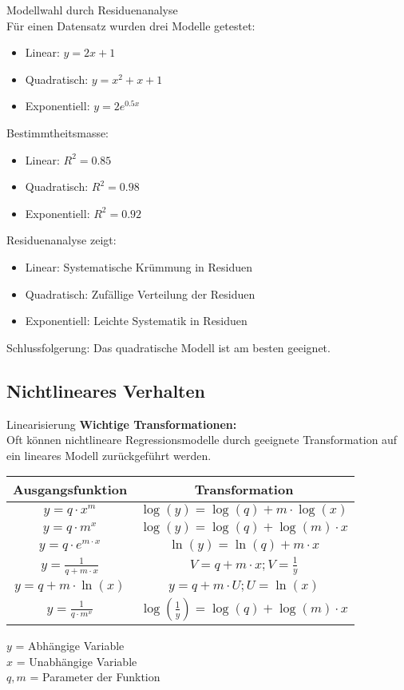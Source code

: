 \begin{example2}{Modellwahl durch Residuenanalyse}\\
Für einen Datensatz wurden drei Modelle getestet:
\begin{itemize}
  \item Linear: $y = 2x + 1$
  \item Quadratisch: $y = x^2 + x + 1$
  \item Exponentiell: $y = 2e^{0.5x}$
\end{itemize}

Bestimmtheitsmasse:
\begin{itemize}
  \item Linear: $R^2 = 0.85$
  \item Quadratisch: $R^2 = 0.98$
  \item Exponentiell: $R^2 = 0.92$
\end{itemize}

Residuenanalyse zeigt:
\begin{itemize}
  \item Linear: Systematische Krümmung in Residuen
  \item Quadratisch: Zufällige Verteilung der Residuen
  \item Exponentiell: Leichte Systematik in Residuen
\end{itemize}

Schlussfolgerung: Das quadratische Modell ist am besten geeignet.
\end{example2}

\subsection{Nichtlineares Verhalten}

\begin{concept}{Linearisierung} \textbf{Wichtige Transformationen:}\\
Oft können nichtlineare Regressionsmodelle durch geeignete Transformation auf ein lineares Modell zurückgeführt werden.
\begin{center}
\begin{tabular}{|c|c|}
\hline
Ausgangsfunktion & Transformation \\
\hline
$y = q \cdot x^m$ & $\log(y) = \log(q) + m \cdot \log(x)$ \\
\hline
$y = q \cdot m^x$ & $\log(y) = \log(q) + \log(m) \cdot x$ \\
\hline
$y = q \cdot e^{m \cdot x}$ & $\ln(y) = \ln(q) + m \cdot x$ \\
\hline
$y = \frac{1}{q+m \cdot x}$ & $V = q + m \cdot x; V = \frac{1}{y}$ \\
\hline
$y = q + m \cdot \ln(x)$ & $y = q + m \cdot U; U = \ln(x)$ \\
\hline
$y = \frac{1}{q \cdot m^x}$ & $\log(\frac{1}{y}) = \log(q) + \log(m) \cdot x$ \\
\hline
\end{tabular}
\end{center}
$y$ = Abhängige Variable\\
$x$ = Unabhängige Variable\\
$q, m$ = Parameter der Funktion
\end{concept}

